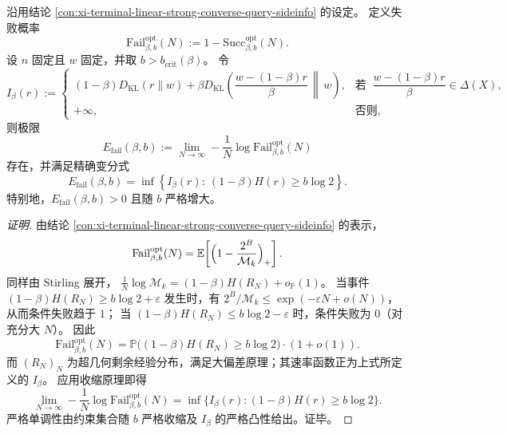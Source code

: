 \begin{conclusion}\label{con:xi-terminal-supercritical-failure-exponent-variational}
沿用结论 \ref{con:xi-terminal-linear-strong-converse-query-sideinfo} 的设定。
定义失败概率
\[
\mathrm{Fail}^{\mathrm{opt}}_{\beta,b}(N):=1-\mathrm{Succ}^{\mathrm{opt}}_{\beta,b}(N).
\]
设 \(n\) 固定且 \(w\) 固定，并取 \(b>b_{\mathrm{crit}}(\beta)\)。
令
\[
I_\beta(r):=
\begin{cases}
(1-\beta)D_{\mathrm{KL}}(r\|w)+\beta D_{\mathrm{KL}}\!\left(\dfrac{w-(1-\beta)r}{\beta}\,\middle\|\,w\right),
& \text{若 }\ \dfrac{w-(1-\beta)r}{\beta}\in\Delta(X),\\[10pt]
+\infty, & \text{否则},
\end{cases}
\]
则极限
\[
E_{\mathrm{fail}}(\beta,b)
:=
\lim_{N\to\infty}-\frac{1}{N}\log \mathrm{Fail}^{\mathrm{opt}}_{\beta,b}(N)
\]
存在，并满足精确变分式
\[
\boxed{\;
E_{\mathrm{fail}}(\beta,b)
=
\inf\left\{I_\beta(r):\ (1-\beta)H(r)\ge b\log 2\right\}.\;}
\]
特别地，\(E_{\mathrm{fail}}(\beta,b)>0\) 且随 \(b\) 严格增大。
\end{conclusion}
\begin{proof}[证明]
由结论 \ref{con:xi-terminal-linear-strong-converse-query-sideinfo} 的表示，
\[
\mathrm{Fail}^{\mathrm{opt}}_{\beta,b}(N)
=
\mathbb{E}\!\left[\Bigl(1-\frac{2^B}{\mathcal{M}_k}\Bigr)_+\right].
\]
同样由 Stirling 展开，
\(
\frac{1}{N}\log\mathcal{M}_k=(1-\beta)H(R_N)+o_{\mathbb{P}}(1)
\)。
当事件 \((1-\beta)H(R_N)\ge b\log 2+\varepsilon\) 发生时，有
\(
2^B/\mathcal{M}_k\le \exp(-\varepsilon N+o(N))
\)，从而条件失败趋于 \(1\)；
当 \((1-\beta)H(R_N)\le b\log 2-\varepsilon\) 时，条件失败为 \(0\)（对充分大 \(N\)）。
因此
\[
\mathrm{Fail}^{\mathrm{opt}}_{\beta,b}(N)
=
\mathbb{P}\bigl((1-\beta)H(R_N)\ge b\log 2\bigr)\cdot(1+o(1)).
\]
而 \((R_N)_{N}\) 为超几何剩余经验分布，满足大偏差原理；其速率函数正为上式所定义的 \(I_\beta\)。
应用收缩原理即得
\[
\lim_{N\to\infty}-\frac{1}{N}\log \mathrm{Fail}^{\mathrm{opt}}_{\beta,b}(N)
=\inf\{I_\beta(r):(1-\beta)H(r)\ge b\log 2\}.
\]
严格单调性由约束集合随 \(b\) 严格收缩及 \(I_\beta\) 的严格凸性给出。证毕。
\end{proof}


